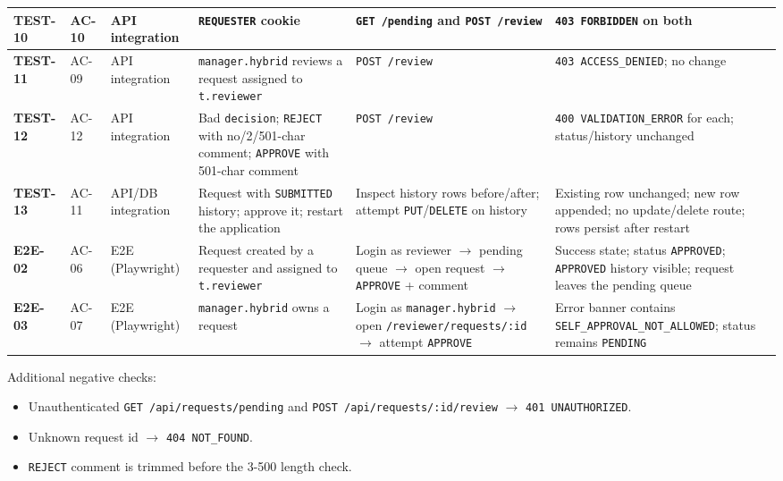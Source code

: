 \documentclass[11pt,a4paper]{article}
\begin{document}
\begin{longtable}{|>{\RaggedRight}p{1.6cm}|>{\centering\arraybackslash}p{1.4cm}|>{\centering\arraybackslash}p{1.2cm}|>{\RaggedRight}p{3.8cm}|>{\RaggedRight}p{3.8cm}|>{\RaggedRight}p{4.0cm}|}
\textbf{TEST-10} & AC-10 & API integration & \texttt{REQUESTER} cookie & \texttt{GET /\allowbreak pending} and \texttt{POST /\allowbreak review} & \texttt{403 FORBIDDEN} on both \\ \hline
\textbf{TEST-11} & AC-09 & API integration & \texttt{manager.\allowbreak hybrid} reviews a request assigned to \texttt{t.\allowbreak reviewer} & \texttt{POST /\allowbreak review} & \texttt{403 ACCESS\_\allowbreak DENIED}; no change \\ \hline
\textbf{TEST-12} & AC-12 & API integration & Bad \texttt{decision}; \texttt{REJECT} with no/2/501-char comment; \texttt{APPROVE} with 501-char comment & \texttt{POST /\allowbreak review} & \texttt{400 VALIDATION\_\allowbreak ERROR} for each; status/history unchanged \\ \hline
\textbf{TEST-13} & AC-11 & API/DB integration & Request with \texttt{SUBMITTED} history; approve it; restart the application & Inspect history rows before/after; attempt \texttt{PUT}/\texttt{DELETE} on history & Existing row unchanged; new row appended; no update/delete route; rows persist after restart \\ \hline
\textbf{E2E-02} & AC-06 & E2E (Playwright) & Request created by a requester and assigned to \texttt{t.\allowbreak reviewer} & Login as reviewer $\rightarrow$ pending queue $\rightarrow$ open request $\rightarrow$ \texttt{APPROVE} + comment & Success state; status \texttt{APPROVED}; \texttt{APPROVED} history visible; request leaves the pending queue \\ \hline
\textbf{E2E-03} & AC-07 & E2E (Playwright) & \texttt{manager.\allowbreak hybrid} owns a request & Login as \texttt{manager.\allowbreak hybrid} $\rightarrow$ open \texttt{/\allowbreak reviewer/\allowbreak requests/\allowbreak :\allowbreak id} $\rightarrow$ attempt \texttt{APPROVE} & Error banner contains \texttt{SELF\_\allowbreak APPROVAL\_\allowbreak NOT\_\allowbreak ALLOWED}; status remains \texttt{PENDING} \\ \hline
\end{longtable}
\vspace{0.3em}


Additional negative checks:\\
\begin{itemize}[leftmargin=*,itemsep=2pt,topsep=2pt]
  \item Unauthenticated \texttt{GET /api/requests/pending} and \texttt{POST /api/requests/:id/review} $\rightarrow$ \texttt{401 UNAUTHORIZED}.
  \item Unknown request id $\rightarrow$ \texttt{404 NOT\_FOUND}.
  \item \texttt{REJECT} comment is trimmed before the 3-500 length check.
\end{itemize}
\end{document}
